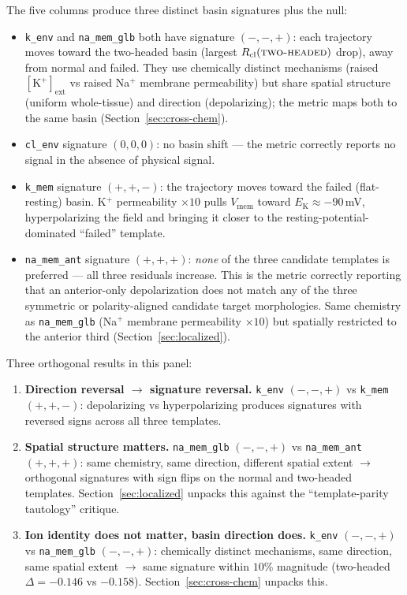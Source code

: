 \documentclass[11pt,a4paper]{article}
\begin{document}
The five columns produce three distinct basin signatures plus the null:
\begin{itemize}\itemsep0pt
\item \texttt{k\_env} and \texttt{na\_mem\_glb} both have signature $(-,-,+)$: each trajectory moves toward the two-headed basin (largest $R_{\mathrm{cl}}(\textsc{two-headed})$ drop), away from normal and failed. They use chemically distinct mechanisms (raised $[\mathrm{K}^{+}]_{\mathrm{ext}}$ vs raised Na$^{+}$ membrane permeability) but share spatial structure (uniform whole-tissue) and direction (depolarizing); the metric maps both to the same basin (Section~\ref{sec:cross-chem}).
\item \texttt{cl\_env} signature $(0,0,0)$: no basin shift --- the metric correctly reports no signal in the absence of physical signal.
\item \texttt{k\_mem} signature $(+,+,-)$: the trajectory moves toward the failed (flat-resting) basin. K$^{+}$ permeability $\times 10$ pulls $V_{\mathrm{mem}}$ toward $E_{\mathrm{K}}\approx -90$\,mV, hyperpolarizing the field and bringing it closer to the resting-potential-dominated ``failed'' template.
\item \texttt{na\_mem\_ant} signature $(+,+,+)$: \emph{none} of the three candidate templates is preferred --- all three residuals increase. This is the metric correctly reporting that an anterior-only depolarization does not match any of the three symmetric or polarity-aligned candidate target morphologies. Same chemistry as \texttt{na\_mem\_glb} (Na$^{+}$ membrane permeability $\times 10$) but spatially restricted to the anterior third (Section~\ref{sec:localized}).
\end{itemize}

Three orthogonal results in this panel:

\begin{enumerate}\itemsep0pt
\item \textbf{Direction reversal $\to$ signature reversal.} \texttt{k\_env} $(-,-,+)$ vs \texttt{k\_mem} $(+,+,-)$: depolarizing vs hyperpolarizing produces signatures with reversed signs across all three templates.
\item \textbf{Spatial structure matters.} \texttt{na\_mem\_glb} $(-,-,+)$ vs \texttt{na\_mem\_ant} $(+,+,+)$: same chemistry, same direction, different spatial extent $\to$ orthogonal signatures with sign flips on the normal and two-headed templates. Section~\ref{sec:localized} unpacks this against the ``template-parity tautology'' critique.
\item \textbf{Ion identity does not matter, basin direction does.} \texttt{k\_env} $(-,-,+)$ vs \texttt{na\_mem\_glb} $(-,-,+)$: chemically distinct mechanisms, same direction, same spatial extent $\to$ same signature within $10$\% magnitude (two-headed $\Delta=-0.146$ vs $-0.158$). Section~\ref{sec:cross-chem} unpacks this.
\end{enumerate}
\end{document}
